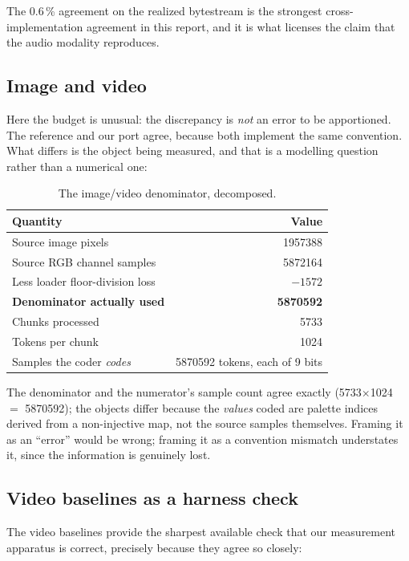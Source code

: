 \documentclass[11pt,a4paper]{article}
\begin{document}
The \num{0.6}\,\% agreement on the realized bytestream is the strongest
cross-implementation agreement in this report, and it is what licenses the claim
that the audio modality reproduces.

\subsection{Image and video}

Here the budget is unusual: the discrepancy is \emph{not} an error to be
apportioned. The reference and our port agree, because both implement the same
convention. What differs is the object being measured, and that is a modelling
question rather than a numerical one:

\begin{table}[htbp]
\centering
\small
\caption{The image/video denominator, decomposed.}
\label{tab:imgbudget}
\begin{tabular}{lr}
\toprule
Quantity & Value \\
\midrule
Source image pixels & \num{1957388} \\
Source RGB channel samples & \num{5872164} \\
Less loader floor-division loss & $-1572$ \\
\textbf{Denominator actually used} & \textbf{\num{5870592}} \\
\midrule
Chunks processed & \num{5733} \\
Tokens per chunk & \num{1024} \\
Samples the coder \emph{codes} & \num{5870592} tokens, each of 9 bits \\
\bottomrule
\end{tabular}
\end{table}

The denominator and the numerator's sample count agree exactly
(\num{5733}$\times$\num{1024} $=$ \num{5870592}); the objects differ because the
\emph{values} coded are palette indices derived from a non-injective map, not the
source samples themselves. Framing it as an ``error'' would be wrong; framing it
as a convention mismatch understates it, since the information is genuinely lost.

\subsection{Video baselines as a harness check}

The video baselines provide the sharpest available check that our measurement
apparatus is correct, precisely because they agree so closely:
\end{document}
